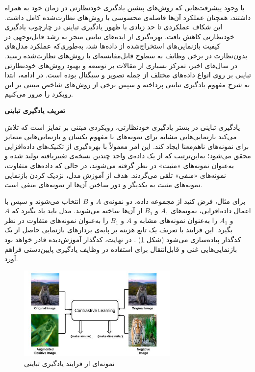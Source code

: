 با وجود پیشرفت‌هایی که روش‌های پیشین یادگیری خودنظارتی در زمان خود به همراه داشتند، همچنان عملکرد آن‌ها فاصله‌ی محسوسی با روش‌های نظارت‌شده کامل داشت. این شکاف عملکردی تا حد زیادی با ظهور یادگیری تباینی در چارچوب یادگیری خودنظارتی کاهش یافت. بهره‌گیری از ایده‌های تباینی منجر به رشد قابل‌توجهی در کیفیت بازنمایی‌های استخراج‌شده از داده‌ها شد، به‌طوری‌که عملکرد مدل‌های بدون‌نظارت در برخی وظایف به سطوح قابل‌مقایسه‌ای با روش‌های نظارت‌شده رسید. در سال‌های اخیر، تمرکز بسیاری از مقالات بر توسعه و بهبود روش‌های خودنظارتی تباینی بر روی انواع داده‌های مختلف از جمله تصویر و سیگنال بوده است. در ادامه، ابتدا به شرح مفهوم یادگیری تباینی پرداخته و سپس برخی از روش‌های شاخص مبتنی بر این رویکرد را مرور می‌کنیم.\newline

\noindent\textbf{تعریف یادگیری تباینی}

یادگیری تباینی در بستر یادگیری خودنظارتی، رویکردی مبتنی بر تمایز است که تلاش می‌کند بازنمایی‌هایی مشابه برای نمونه‌های با مفهوم یکسان و بازنمایی‌هایی متمایز برای نمونه‌های ناهم‌معنا ایجاد کند. این امر معمولاً با بهره‌گیری از تکنیک‌های داده‌افزایی محقق می‌شود؛ به‌این‌ترتیب که از یک داده‌ی واحد چندین نسخه‌ی تغییریافته تولید شده و به‌عنوان نمونه‌های «مثبت» در نظر گرفته می‌شوند، در حالی که داده‌های متفاوت، نمونه‌های «منفی» تلقی می‌گردند. هدف از آموزش مدل، نزدیک کردن بازنمایی نمونه‌های مثبت به یکدیگر و دور ساختن آن‌ها از نمونه‌های منفی است.

برای مثال، فرض کنید از مجموعه داده، دو نمونه‌ی $A$ و $B$ انتخاب می‌شوند و سپس با اعمال داده‌افزایی، نمونه‌های $A_1$ و $B_1$ از آن‌ها ساخته می‌شوند. مدل باید یاد بگیرد که $A$ و $A_1$ را به‌عنوان نمونه‌های مشابه و $A$ و $B_1$ را به‌عنوان نمونه‌های متفاوت در نظر بگیرد. این فرایند با تعریف یک تابع هزینه بر پایه‌ی بردارهای بازنمایی حاصل از یک کدگذار پیاده‌سازی می‌شود (شکل \ref{fig:contrastive}) \cite{jaiswal2020survey}. در نهایت، کدگذار آموزش‌دیده قادر خواهد بود بازنمایی‌هایی غنی و قابل‌انتقال برای استفاده در وظایف یادگیری پایین‌دستی فراهم آورد.

\begin{figure}[htb!]
\centering
\includegraphics[width=0.7\textwidth]{Images/Chapter2/contrastive.png}
\caption{نمونه‌ای از فرایند یادگیری تباینی}
\label{fig:contrastive}
\end{figure}

